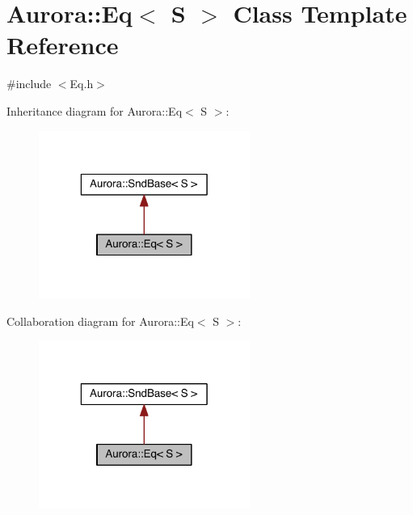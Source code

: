 \hypertarget{class_aurora_1_1_eq}{}\section{Aurora\+:\+:Eq$<$ S $>$ Class Template Reference}
\label{class_aurora_1_1_eq}


{\ttfamily \#include $<$Eq.\+h$>$}



Inheritance diagram for Aurora\+:\+:Eq$<$ S $>$\+:
\nopagebreak
\begin{figure}[H]
\begin{center}
\leavevmode
\includegraphics[width=196pt]{class_aurora_1_1_eq__inherit__graph}
\end{center}
\end{figure}


Collaboration diagram for Aurora\+:\+:Eq$<$ S $>$\+:
\nopagebreak
\begin{figure}[H]
\begin{center}
\leavevmode
\includegraphics[width=196pt]{class_aurora_1_1_eq__coll__graph}
\end{center}
\end{figure}
